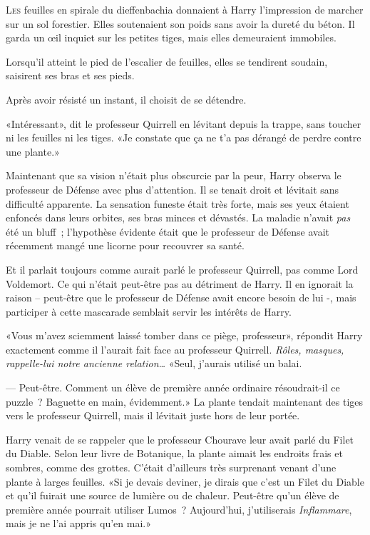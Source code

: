 
\lettrine{L}{es} feuilles en spirale du dieffenbachia donnaient à Harry l'impression de marcher sur un sol forestier. Elles soutenaient son poids sans avoir la dureté du béton. Il garda un œil inquiet sur les petites tiges, mais elles demeuraient immobiles.

Lorsqu'il atteint le pied de l'escalier de feuilles, elles se tendirent soudain, saisirent ses bras et ses pieds.

Après avoir résisté un instant, il choisit de se détendre.

«Intéressant», dit le professeur Quirrell en lévitant depuis la trappe, sans toucher ni les feuilles ni les tiges. «Je constate que ça ne t'a pas dérangé de perdre contre une plante.»

Maintenant que sa vision n'était plus obscurcie par la peur, Harry observa le professeur de Défense avec plus d'attention. Il se tenait droit et lévitait sans difficulté apparente. La sensation funeste était très forte, mais ses yeux étaient enfoncés dans leurs orbites, ses bras minces et dévastés. La maladie n'avait \emph{pas} été un bluff~; l'hypothèse évidente était que le professeur de Défense avait récemment mangé une licorne pour recouvrer sa santé.

Et il parlait toujours comme aurait parlé le professeur Quirrell, pas comme Lord Voldemort. Ce qui n'était peut-être pas au détriment de Harry. Il en ignorait la raison -- peut-être que le professeur de Défense avait encore besoin de lui -, mais participer à cette mascarade semblait servir les intérêts de Harry.

«Vous m'avez sciemment laissé tomber dans ce piège, professeur», répondit Harry exactement comme il l'aurait fait face au professeur Quirrell. \emph{Rôles, masques, rappelle-lui notre ancienne relation…} «Seul, j'aurais utilisé un balai.

--- Peut-être. Comment un élève de première année ordinaire résoudrait-il ce puzzle~? Baguette en main, évidemment.» La plante tendait maintenant des tiges vers le professeur Quirrell, mais il lévitait juste hors de leur portée.

Harry venait de se rappeler que le professeur Chourave leur avait parlé du Filet du Diable. Selon leur livre de Botanique, la plante aimait les endroits frais et sombres, comme des grottes. C'était d'ailleurs très surprenant venant d'une plante à larges feuilles. «Si je devais deviner, je dirais que c'est un Filet du Diable et qu'il fuirait une source de lumière ou de chaleur. Peut-être qu'un élève de première année pourrait utiliser Lumos~? Aujourd'hui, j'utiliserais \emph{Inflammare}, mais je ne l'ai appris qu'en mai.»

